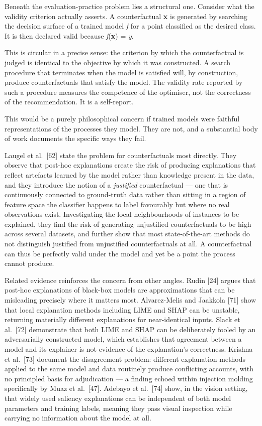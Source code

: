 Beneath the evaluation-practice problem lies a structural one. Consider what the validity criterion actually asserts. A counterfactual \textbf{x}\textquotesingle{} is generated by searching the decision surface of a trained model \emph{f} for a point classified as the desired class. It is then declared valid because \emph{f}(\textbf{x}\textquotesingle{}) = \emph{y}\textquotesingle{}.

This is circular in a precise sense: the criterion by which the counterfactual is judged is identical to the objective by which it was constructed. A search procedure that terminates when the model is satisfied will, by construction, produce counterfactuals that satisfy the model. The validity rate reported by such a procedure measures the competence of the optimiser, not the correctness of the recommendation. It is a self-report.

This would be a purely philosophical concern if trained models were faithful representations of the processes they model. They are not, and a substantial body of work documents the specific ways they fail.

Laugel et al.~{[}62{]} state the problem for counterfactuals most directly. They observe that post-hoc explanations create the risk of producing explanations that reflect artefacts learned by the model rather than knowledge present in the data, and they introduce the notion of a \emph{justified} counterfactual --- one that is continuously connected to ground-truth data rather than sitting in a region of feature space the classifier happens to label favourably but where no real observations exist. Investigating the local neighbourhoods of instances to be explained, they find the risk of generating unjustified counterfactuals to be high across several datasets, and further show that most state-of-the-art methods do not distinguish justified from unjustified counterfactuals at all. A counterfactual can thus be perfectly valid under the model and yet be a point the process cannot produce.

Related evidence reinforces the concern from other angles. Rudin {[}24{]} argues that post-hoc explanations of black-box models are approximations that can be misleading precisely where it matters most. Alvarez-Melis and Jaakkola {[}71{]} show that local explanation methods including LIME and SHAP can be unstable, returning materially different explanations for near-identical inputs. Slack et al.~{[}72{]} demonstrate that both LIME and SHAP can be deliberately fooled by an adversarially constructed model, which establishes that agreement between a model and its explainer is not evidence of the explanation's correctness. Krishna et al.~{[}73{]} document the disagreement problem: different explanation methods applied to the same model and data routinely produce conflicting accounts, with no principled basis for adjudication --- a finding echoed within injection molding specifically by Muaz et al.~{[}47{]}. Adebayo et al.~{[}74{]} show, in the vision setting, that widely used saliency explanations can be independent of both model parameters and training labels, meaning they pass visual inspection while carrying no information about the model at all.

